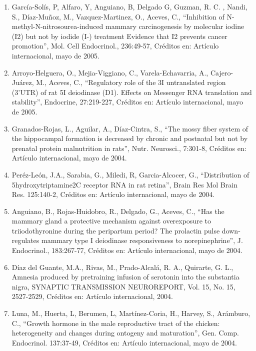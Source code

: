 \documentclass[12pt]{article}
\begin{document}
\begin{enumerate}
\item García-Solís, P, Alfaro, Y, Anguiano, B, Delgado G, Guzman, R. C. , Nandi, S., Díaz-Muñoz, M., Vazquez-Martinez, O., Aceves, C., 
“Inhibition of N-methyl-N-nitrosourea-induced mammary carcinogenesis by molecular iodine (I2) but not by iodide (I-) treatment Evidence 
that I2 prevents cancer promotion”, Mol. Cell Endocrinol., 236:49-57, Créditos en: Artículo internacional, mayo de 2005.

\item Arroyo-Helguera, O., Mejia-Viggiano, C., Varela-Echavarria, A., Cajero-Juárez, M., Aceves, C., “Regulatory role of the 3I 
untranslated region (3’UTR) of rat 5I deiodinase (D1). Effects on Messenger RNA translation and stability”, Endocrine, 27:219-227, 
Créditos en: Artículo internacional, mayo de 2005.

\item Granados-Rojas, L., Aguilar, A., Díaz-Cintra, S., “The mossy fiber system of the hippocampal formation is decreased by chronic 
and 
postnatal but not by prenatal protein malnutrition in rats”, Nutr. Neurosci., 7:301-8, Créditos en: Artículo internacional, mayo de 
2004.

\item Peréz-León, J.A., Sarabia, G., Miledi, R, Garcia-Alcocer, G., “Distribution of 5hydroxytriptamine2C receptor RNA in rat retina”, 
Brain Res Mol Brain Res. 125:140-2, Créditos en: Artículo internacional, mayo de 2004.

\item Anguiano, B., Rojas-Huidobro, R., Delgado, G., Aceves, C., “Has the mammary gland a protective mechanism against overexposure to 
triiodothyronine during the peripartum period? The prolactin pulse down-regulates mammary type I deiodinase responsiveness to 
norepinephrine”, J. Endocrinol., 183:267-77, Créditos en: Artículo internacional, mayo de 2004.

\item Díaz del Guante, M.A., Rivas, M., Prado-Alcalá, R. A., Quirarte, G. L., Amnesia produced by pretraining infusion of serotonin 
into 
the substantia nigra, SYNAPTIC TRANSMISSION NEUROREPORT, Vol. 15, No. 15, 2527-2529, Créditos en: Artículo internacional, 2004.

\item Luna, M., Huerta, L, Berumen, L, Martínez-Coria, H., Harvey, S., Arámburo, C., “Growth hormone in the male reproductive tract of 
the chicken: heterogeneity and changes during ontogeny and maturation”, Gen. Comp. Endocrinol. 137:37-49, Créditos en: Artículo 
internacional, mayo de 2004.


\end{enumerate}
\end{document}
